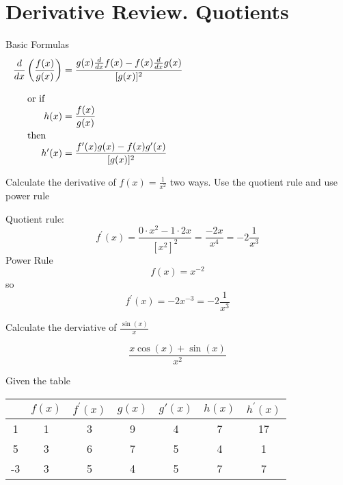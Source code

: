 \section*{Derivative Review. Quotients}

Basic Formulas
\begin{equation*}
  \begin{aligned}
    \frac{d}{dx} \left(\frac{f(x)}{g(x)}\right) &= \frac{g(x)\frac{d}{dx} f(x)-f(x)\frac{d}{dx} g(x)}{[g(x)]^2} \\
    \noalign{\vspace{1 em}or if}
    h(x) &= \frac{f(x)}{g(x)} \\
    \noalign{then}
    h'(x) &= \frac{f^\prime(x)g(x)-f(x)g^\prime(x)}{[g(x)]^2} \\
  \end{aligned}
\end{equation*}

\begin{questions}
\question
Calculate the derivative of $f(x)=\frac{1}{x^2}$ two ways. Use the quotient rule and use power rule
\begin{solution}[1.5in]
  Quotient rule:
  $$f^\prime(x)=\frac{0\cdot x^2-1 \cdot 2x}{[x^2]^2} = \frac{-2x}{x^4} = -2\frac{1}{x^3}$$
  Power Rule
  $$f(x)=x^{-2}$$
  so
  $$f^\prime(x)=-2x^{-3}=-2\frac{1}{x^3}$$
\end{solution}
\question
Calculate the derviative of $\frac{\sin(x)}{x}$
\begin{solution}[1.5in]
  $$\frac{x\cos(x)+\sin(x)}{x^2}$$
\end{solution}
\question
Given the table

  \begin{tabular}{c|cccccc}
    \hline
    & $f(x)$ & $f^\prime(x)$ & $g(x)$ & $g'(x)$ & $h(x)$ & $h^\prime(x)$ \\
    \hline
    1& 1 & 3 & 9 & 4 & 7 & 17 \\
    \hline
    5 &3 & 6 & 7 & 5 & 4 & 1 \\
    \hline
    -3 &3 & 5 & 4 & 5 & 7& 7  \\
    \hline
  \end{tabular}
  \vspace{1em}
\end{questions}
